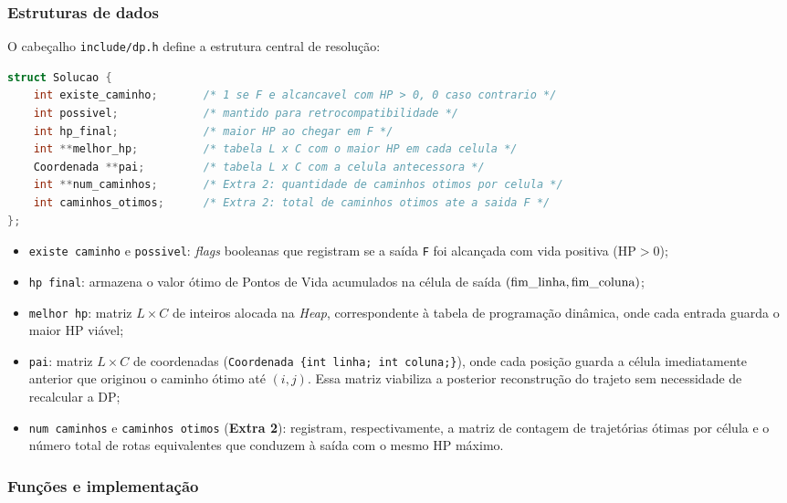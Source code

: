 \documentclass[12pt,a4paper]{article}
\makeatletter
\DeclareRobustCommand{\_}{%
  \ifmmode
    \nfss@text{\textunderscore}%
  \else
    \textunderscore\allowbreak
  \fi
}
\makeatother
\begin{document}
\subsubsection*{Estruturas de dados}

O cabeçalho \texttt{include/dp.h} define a estrutura central de resolução:

\begin{lstlisting}[language=C, caption={Estrutura Solucao que consolida os resultados da Programação Dinâmica.}]
struct Solucao {
    int existe_caminho;       /* 1 se F e alcancavel com HP > 0, 0 caso contrario */
    int possivel;             /* mantido para retrocompatibilidade */
    int hp_final;             /* maior HP ao chegar em F */
    int **melhor_hp;          /* tabela L x C com o maior HP em cada celula */
    Coordenada **pai;         /* tabela L x C com a celula antecessora */
    int **num_caminhos;       /* Extra 2: quantidade de caminhos otimos por celula */
    int caminhos_otimos;      /* Extra 2: total de caminhos otimos ate a saida F */
};
\end{lstlisting}

\begin{itemize}
    \item \texttt{existe\_caminho} e \texttt{possivel}: \textit{flags} booleanas que registram se a saída \texttt{F} foi alcançada com vida positiva ($\text{HP} > 0$);
    \item \texttt{hp\_final}: armazena o valor ótimo de Pontos de Vida acumulados na célula de saída $(\text{fim\_linha}, \text{fim\_coluna})$;
    \item \texttt{melhor\_hp}: matriz $L \times C$ de inteiros alocada na \textit{Heap}, correspondente à tabela de programação dinâmica, onde cada entrada guarda o maior HP viável;
    \item \texttt{pai}: matriz $L \times C$ de coordenadas (\texttt{Coordenada \{int linha; int coluna;\}}), onde cada posição guarda a célula imediatamente anterior que originou o caminho ótimo até $(i,j)$. Essa matriz viabiliza a posterior reconstrução do trajeto sem necessidade de recalcular a DP;
    \item \texttt{num\_caminhos} e \texttt{caminhos\_otimos} (\textbf{Extra 2}): registram, respectivamente, a matriz de contagem de trajetórias ótimas por célula e o número total de rotas equivalentes que conduzem à saída com o mesmo HP máximo.
\end{itemize}

\subsubsection*{Funções e implementação}
\end{document}

